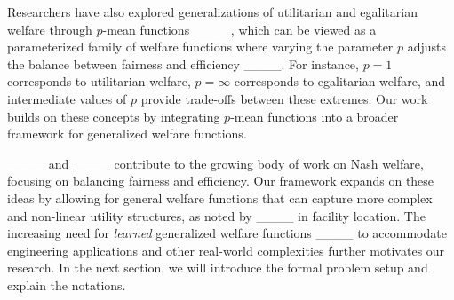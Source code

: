 Researchers have also explored generalizations of utilitarian and egalitarian welfare through $p$-mean functions ____, which can be viewed as a parameterized family of welfare functions where varying the parameter $p$ adjusts the balance between fairness and efficiency ____. For instance, $p = 1$ corresponds to utilitarian welfare, $p = \infty$ corresponds to egalitarian welfare, and intermediate values of $p$ provide trade-offs between these extremes. Our work builds on these concepts by integrating $p$-mean functions into a broader framework for generalized welfare functions.

____ and ____ contribute to the growing body of work on Nash welfare, focusing on balancing fairness and efficiency. Our framework expands on these ideas by allowing for general welfare functions that can capture more complex and non-linear utility structures, as noted by ____ in facility location. The increasing need for \textit{learned} generalized welfare functions ____ to accommodate engineering applications and other real-world complexities further motivates our research. In the next section, we will introduce the formal problem setup and explain the notations.




